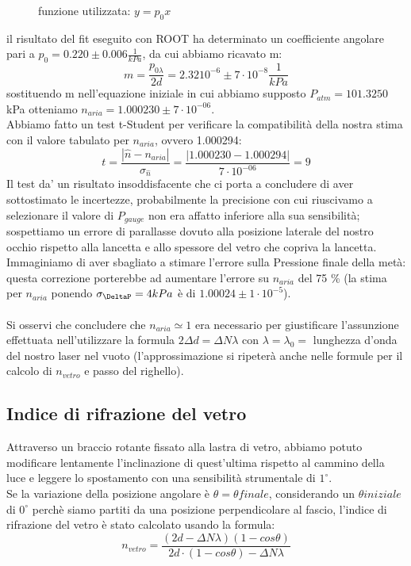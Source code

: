 \documentclass{article}
\theoremstyle{definition}
\begin{document}
\begin{figure}[!ht]
    	\captionsetup{labelformat=empty}
    \caption{funzione utilizzata: $y = p_{0}x$}
\end{figure}

il risultato del fit eseguito con ROOT ha determinato un coefficiente angolare pari a \(p_{0} =  0.220 \pm   0.006 \frac{1}{kPa}  \), da cui abbiamo ricavato m:
\[m = \frac{p_{0 \lambda}}{2d} = 2.32 10^{-6} \pm 7 \cdot 10^{-8} \frac{1}{kPa}\]
sostituendo m nell'equazione iniziale in cui abbiamo supposto \(P_{atm} = 101.3250\)kPa  otteniamo \(n_{aria} = 1.000230  \pm  7 \cdot 10^{-06}\).\\

\noindent Abbiamo fatto un test t-Student per verificare la compatibilità della nostra stima con il valore tabulato per \(n_{aria}\), ovvero 1.000294:
\[t = \frac{\left | \hat{n} - n_{aria}\right |}{\sigma_{\hat{n}}} = \frac{\left |1.000230 - 1.000294 \right|}{ 7 \cdot 10^{-06}} = 9\]
Il test da' un  risultato insoddisfacente che ci porta a concludere di aver sottostimato le incertezze, probabilmente la precisione con cui riuscivamo a selezionare il valore di \(P_{gauge}\) non era affatto inferiore alla sua sensibilità; sospettiamo un errore di parallasse dovuto alla posizione laterale del nostro occhio rispetto alla lancetta e allo spessore del vetro che copriva la lancetta.
Immaginiamo di aver sbagliato a stimare l'errore sulla Pressione finale della metà: questa correzione porterebbe ad aumentare l'errore su \(n_{aria}\) del 75 \% (la stima per $n_{aria}$ ponendo $\sigma_{\DeltaP}=4 kPa$ è di $1.00024  \pm  1 \cdot 10^{-5}$).\\\\
Si osservi che concludere che \(n_{aria} \simeq 1\) era necessario per giustificare l'assunzione effettuata nell'utilizzare la formula \(2\Delta d = \Delta N \lambda\) con \(\lambda = \lambda_{0} =\) lunghezza d'onda del nostro laser nel vuoto (l'approssimazione si ripeterà anche nelle formule per il calcolo di \(n_{vetro}\) e passo del righello).

\subsection{Indice di rifrazione del vetro}
Attraverso un braccio rotante fissato alla lastra di vetro, abbiamo potuto modificare lentamente l'inclinazione di quest'ultima rispetto al cammino della luce e leggere lo spostamento con una sensibilità strumentale di \(1^{\circ}\).\\
Se la variazione della posizione angolare è \(\theta = \theta finale\), considerando un \(\theta iniziale\) di \(0^{\circ}\) perchè siamo partiti da una posizione perpendicolare al fascio, l'indice di rifrazione del vetro è stato calcolato usando la formula:
\[n_{vetro} =\frac{(2d - \Delta N \lambda)(1 - cos\theta)}{2d \cdot (1 - cos\theta) - \Delta N \lambda}\]
\end{document}
